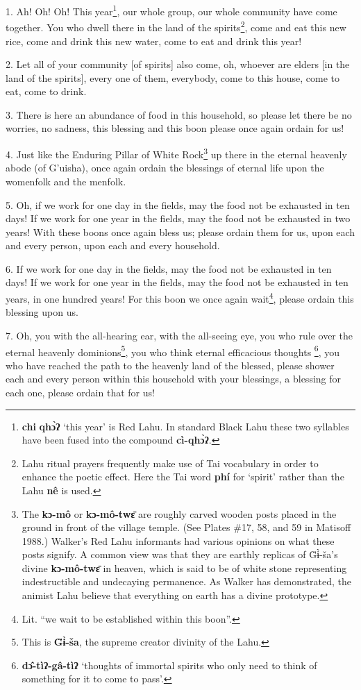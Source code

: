 \setcounter{footnote}{0}

1. Ah! Oh! Oh! This year\footnote{\textbf{chi} \textbf{qhɔ̀ʔ} `this year' is Red Lahu. In standard Black Lahu these two syllables have been fused into the compound \textbf{cì-qhɔ̀ʔ}.}, our whole group, our whole community have come together.
You who dwell there in the land of the spirits\footnote{Lahu ritual prayers frequently make use of Tai vocabulary in order to enhance the poetic effect. Here the Tai word \textbf{phí} for `spirit' rather than the Lahu \textbf{nê} is used.}, come and eat this new rice,
come and drink this new water, come to eat and drink this year!

2. Let all of your community [of spirits] also come, oh, whoever are elders [in
the land of the spirits], every one of them, everybody, come to this house, come
to eat, come to drink.

3. There is here an abundance of food in this household, so please let there be
no worries, no sadness, this blessing and this boon please once again ordain for
us!

4. Just like the Enduring Pillar of White Rock\footnote{The \textbf{kɔ-mô} or \textbf{kɔ-mô-twɛ̄} are roughly carved wooden posts placed in the ground in front of the village temple. (See Plates \#17, 58, and 59 in Matisoff 1988.) Walker's Red Lahu informants had various opinions on what these posts signify. A common view was that they are earthly replicas of G̈ɨ̀-ša's divine \textbf{kɔ-mô-twɛ̄} in heaven, which is said to be of white stone representing indestructible and undecaying permanence. As Walker has demonstrated, the animist Lahu believe that everything on earth has a divine prototype.} up there in the eternal heavenly
abode (of G'uisha), once again ordain the blessings of eternal life upon the womenfolk
and the menfolk.

5. Oh, if we work for one day in the fields, may the food not be exhausted in ten
days! If we work for one year in the fields, may the food not be exhausted in
two years! With these boons once again bless us; please ordain them for us, upon
each and every person, upon each and every household.

6. If we work for one day in the fields, may the food not be exhausted in ten days!
If we work for one year in the fields, may the food not be exhausted in ten years,
in one hundred years! For this boon we once again wait\footnote{Lit. ``we wait to be established within this boon''.}, please ordain this
blessing upon us.

7. Oh, you with the all-hearing ear, with the all-seeing eye, you who rule over
the eternal heavenly dominions\footnote{This is \textbf{G̈ɨ̀-ša}, the supreme creator divinity of the Lahu.}, you who think eternal efficacious thoughts
\footnote{\textbf{dɔ̂-tìʔ-gâ-tìʔ} `thoughts of immortal spirits who only need to think of something for it to come to pass'.}, you who have reached the path to the heavenly land of the blessed, please
shower each and every person within this household with your blessings, a blessing
for each one, please ordain that for us!

